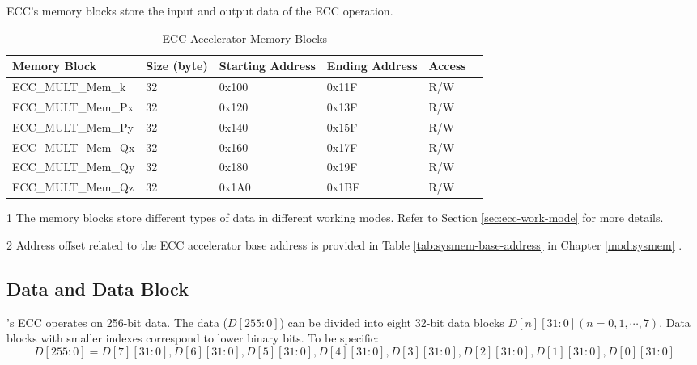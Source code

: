 \documentclass[main\_\_EN.tex]{subfiles}
\begin{document}
ECC's memory blocks store the input and output data of the ECC operation.

\begin{table}[H]
    \centering
    \caption{ECC Accelerator Memory Blocks} \label{tab:ecc-memory}
    \begin{threeparttable}
    \begin{tabular}{ | l | l | l | l | l | l | }
    \hline
        \rowcolor{lightgray}
        \textbf{Memory Block\tnote{1}} & \textbf{Size (byte)}  &  \textbf{Starting Address}\tnote{2} &  \textbf{Ending Address} \tnote{2} & \textbf{Access}   \\ \hline
        ECC\_MULT\_Mem\_k    & 32  & 0x100 & 0x11F & R/W \\ \hline
        ECC\_MULT\_Mem\_Px   & 32  & 0x120 & 0x13F & R/W \\ \hline
        ECC\_MULT\_Mem\_Py   & 32  & 0x140 & 0x15F & R/W \\ \hline
        ECC\_MULT\_Mem\_Qx   & 32  & 0x160 & 0x17F & R/W \\ \hline
        ECC\_MULT\_Mem\_Qy   & 32  & 0x180 & 0x19F & R/W \\ \hline
        ECC\_MULT\_Mem\_Qz   & 32  & 0x1A0 & 0x1BF & R/W \\ \hline
    \end{tabular}
    \begin{tablenotes}
        \item[1] The memory blocks store different types of data in different working modes. Refer to Section \ref{sec:ecc-work-mode} for more details.
        \item[2] Address offset related to the ECC accelerator base address is provided in Table \ref{tab:sysmem-base-address} in Chapter \ref{mod:sysmem} \textit{}.
    \end{tablenotes}
    \end{threeparttable}
\end{table}


\subsection{Data and Data Block}

\chipname{}'s ECC operates on 256-bit data. The data ($D[255:0]$) can be divided into eight 32-bit data blocks $D[n][31:0] (n=0, 1, \cdots, 7)$. Data blocks with smaller indexes correspond to lower binary bits. To be specific:
\[
D[255:0] = {D[7][31:0],D[6][31:0],D[5][31:0],
D[4][31:0],D[3][31:0],D[2][31:0],D[1][31:0],D[0][31:0]}
\]
\end{document}
